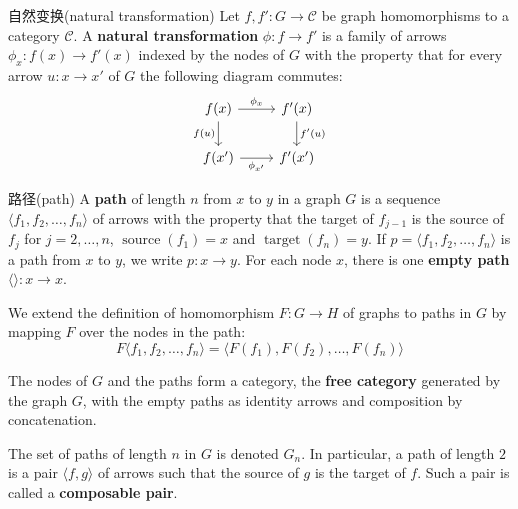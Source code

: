 \documentclass{beamer}
\begin{document}
\begin{frame}[fragile]{自然变换(natural transformation)}
Let $f,f'\colon G \to \mathcal{C}$ be graph homomorphisms to a category $\mathcal{C}$. A \textbf{natural transformation} $\phi\colon f \to f'$ is a family of arrows $\phi_x\colon f(x) \to f'(x)$ indexed by the nodes of $G$ with the property that for every arrow $u\colon x \to x'$ of $G$ the following diagram commutes:
\[
\begin{tikzcd}
f(x) \arrow[r,"\phi_x"] \arrow[d,"f(u)"'] & f'(x) \arrow[d,"f'(u)"] \\
f(x') \arrow[r,"\phi_{x'}"'] & f'(x')
\end{tikzcd}
\]
\end{frame}

\begin{frame}{路径(path)}
A \textbf{path} of length $n$ from $x$ to $y$ in a graph $G$ is a sequence $\langle f_1,f_2,\dots,f_n\rangle$ of arrows with the property that the target of $f_{j-1}$ is the source of $f_j$ for $j=2,\dots,n$, $\operatorname{source}(f_1)=x$ and $\operatorname{target}(f_n)=y$. If $p=\langle f_1,f_2,\dots,f_n\rangle$ is a path from $x$ to $y$, we write $p\colon x \to y$. For each node $x$, there is one \textbf{empty path} $\langle\rangle\colon x \to x$.

\vspace{2mm}

We extend the definition of homomorphism $F\colon G \to H$ of graphs to paths in $G$ by mapping $F$ over the nodes in the path:
\[
F\langle f_1,f_2,\dots,f_n\rangle = \langle F(f_1),F(f_2),\dots,F(f_n)\rangle
\]

The nodes of $G$ and the paths form a category, the \textbf{free category} generated by the graph $G$, with the empty paths as identity arrows and composition by concatenation.

\vspace{2mm}

The set of paths of length $n$ in $G$ is denoted $G_n$. In particular, a path of length $2$ is a pair $\langle f,g\rangle$ of arrows such that the source of $g$ is the target of $f$. Such a pair is called a \textbf{composable pair}.
\end{frame}
\end{document}
